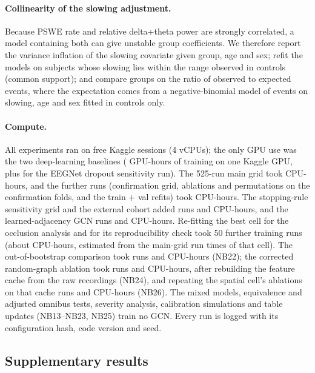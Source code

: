 \paragraph{Collinearity of the slowing adjustment.} Because PSWE rate and relative delta+theta power are
strongly correlated, a model containing both can give unstable group coefficients. We therefore report
the variance inflation of the slowing covariate given group, age and sex; refit the models on subjects
whose slowing lies within the range observed in controls (common support); and compare groups on the
ratio of observed to expected events, where the expectation comes from a negative-binomial model of
events on slowing, age and sex fitted in controls only.

\paragraph{Compute.}
All experiments ran on free Kaggle sessions (4 vCPUs); the only GPU use was the two deep-learning
baselines (\deepGpuHours{} GPU-hours of training on one Kaggle GPU, plus \dropGpuHours{} for the EEGNet
dropout sensitivity run). The 525-run main grid
took \cpuHoursGrid{} CPU-hours, and the \nConfirmRuns{} further runs (confirmation grid, ablations and permutations on the
confirmation folds, and the train + val refits) took \cpuHoursConfirm{} CPU-hours. The stopping-rule sensitivity grid and the
external cohort added \nExtraRuns{} runs and \cpuHoursExtra{} CPU-hours, and the learned-adjacency GCN
\learnNRuns{} runs and \cpuHoursLearned{} CPU-hours. Re-fitting the best cell for the occlusion analysis and
for its reproducibility check took 50 further training runs (about \cpuHoursOcc{} CPU-hours, estimated from the
main-grid run times of that cell). The out-of-bootstrap comparison took \bootNRuns{} runs and \cpuHoursBoot{} CPU-hours (NB22); the corrected random-graph ablation took \aTwoNRuns{} runs and \cpuHoursATwo{} CPU-hours, after rebuilding the feature cache from the raw recordings (NB24), and repeating the spatial cell's ablations on that cache \rbNRuns{} runs and \cpuHoursRb{} CPU-hours (NB26). The mixed models, equivalence and adjusted omnibus tests, severity analysis, calibration simulations and table updates (NB13--NB23, NB25) train no GCN. Every run is logged with its configuration hash, code version and seed.

\subsection*{Supplementary results}
